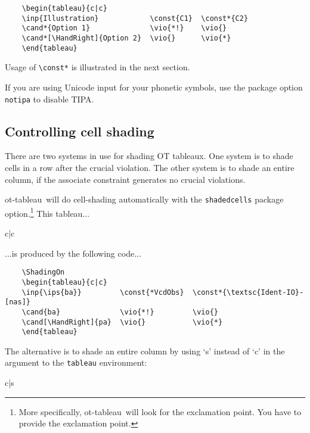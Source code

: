 \documentclass{article}
\def\tabl{\textsf{ot-tableau}}
\begin{document}
\begin{verbatim}
	\begin{tableau}{c|c}
	\inp{Illustration}            \const{C1}  \const*{C2}
	\cand*{Option 1}              \vio{*!}    \vio{}
	\cand*[\HandRight]{Option 2}  \vio{}      \vio{*}
	\end{tableau}
\end{verbatim}

\noindent Usage of \verb+\const*+ is illustrated in the next section.

If you are using Unicode input for your phonetic symbols, use the package option \verb+notipa+ to disable TIPA.
 
\subsection{Controlling cell shading}
There are two systems in use for shading OT tableaux. One system is to shade cells in a row after the crucial violation. The other system is to shade an entire column, if the associate constraint generates no crucial violations.

\tabl\ will do cell-shading automatically with the \verb+shadedcells+ package option.\footnote{More specifically, \tabl\ will look for the exclamation point. You have to provide the exclamation point.} This tableau...

\begin{center}
	\ShadingOn
	\begin{tableau}{c|c}
				
			\vio{*!}	\vio{}
		\vio{}		\vio{*}
	\end{tableau}
\end{center}

\noindent ...is produced by the following code...

\begin{verbatim}
	\ShadingOn
	\begin{tableau}{c|c}
	\inp{\ips{ba}}         \const{*VcdObs}  \const*{\textsc{Ident-IO}-[nas]}
	\cand{ba}              \vio{*!}         \vio{}
	\cand[\HandRight]{pa}  \vio{}           \vio{*}
	\end{tableau}
\end{verbatim}

The alternative is to shade an entire column by using `s' instead of `c' in the argument to the \verb+tableau+ environment:

\begin{center}
	\begin{tableau}{c|s}
	           
	              \vio{*!}         \vio{}
	  \vio{}           \vio{*}
	\end{tableau}
\end{center}
\end{document}
